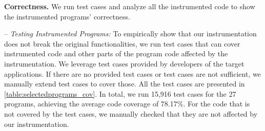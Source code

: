 %


\noindent
{\bf Correctness.}
We run test cases and analyze all the instrumented code to show the instrumented programs' correctness. 

-- \textit{Testing Instrumented Programs:}
    To empirically show that our instrumentation does not break the original functionalities, we run test cases that can cover instrumented code and other parts of the program code affected by the instrumentation. 
    We leverage test cases provided by developers of the target applications. If there are no provided test cases or test cases are not sufficient, we manually extend test cases to cover those. All the test cases are presented in \autoref{table:selectedprograms_cov}. %
    In total, we run 15,916 test cases for the 27 programs, achieving the average code coverage of 78.17\%. For the code that is not covered by the test cases, we manually checked that they are not affected by our instrumentation. %

